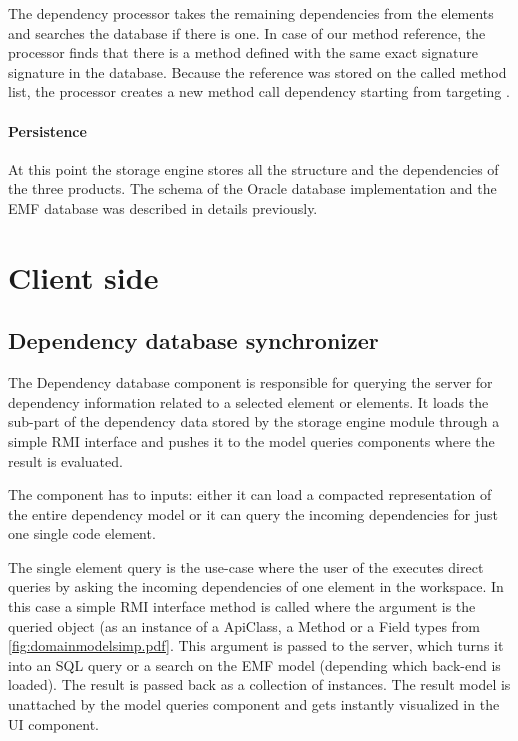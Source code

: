 The dependency processor takes the remaining dependencies from the elements and 
searches the database if there is one. In case of our method reference, the processor
finds that there is a  method defined with the same exact 
signature signature in the database. Because the reference was stored on the called 
method list, the processor creates a new method call dependency starting from 
 targeting .

\paragraph{Persistence}
At this point the storage engine stores all the structure and the dependencies 
of the three products. The schema of the Oracle database implementation and the EMF
database was described in details previously.



\section{Client side}


\subsection{Dependency database synchronizer}
\label{sect:depdbsynch}


The Dependency database component is responsible for querying the server for
dependency information related to a selected element or elements. It loads the
sub-part of the dependency data stored by the storage engine module through a
simple RMI interface and pushes it to the model queries components where the
result is evaluated.

The component has to inputs: either it can load a compacted representation of the 
entire dependency model or it can query the incoming dependencies for just one 
single code element. 

The single element query is the use-case where the user of the \ptool  executes
direct queries by asking the incoming dependencies of one element in
the workspace. In this case a simple RMI interface method is called where the
argument is the queried object (as an instance of a ApiClass, a Method or a
Field types from \autoref{fig:domainmodelsimp.pdf}. This argument is passed to
the server, which turns it into an SQL query or a search on the EMF model
(depending which back-end is loaded). The result is passed back as a collection
of  instances. The result model is unattached by the model
queries component and gets instantly visualized in the UI component.

